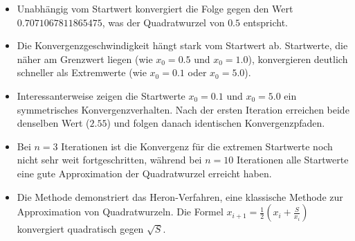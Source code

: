 \documentclass{article}
\begin{document}
\begin{itemize}
  \item Unabhängig vom Startwert konvergiert die Folge gegen den Wert $0.7071067811865475$, was der Quadratwurzel von $0.5$ entspricht.
  
  \item Die Konvergenzgeschwindigkeit hängt stark vom Startwert ab. Startwerte, die näher am Grenzwert liegen (wie $x_0 = 0.5$ und $x_0 = 1.0$), konvergieren deutlich schneller als Extremwerte (wie $x_0 = 0.1$ oder $x_0 = 5.0$).
  
  \item Interessanterweise zeigen die Startwerte $x_0 = 0.1$ und $x_0 = 5.0$ ein symmetrisches Konvergenzverhalten. Nach der ersten Iteration erreichen beide denselben Wert ($2.55$) und folgen danach identischen Konvergenzpfaden.
  
  \item Bei $n = 3$ Iterationen ist die Konvergenz für die extremen Startwerte noch nicht sehr weit fortgeschritten, während bei $n = 10$ Iterationen alle Startwerte eine gute Approximation der Quadratwurzel erreicht haben.
  
  \item Die Methode demonstriert das Heron-Verfahren, eine klassische Methode zur Approximation von Quadratwurzeln. Die Formel $x_{i+1} = \frac{1}{2}(x_i + \frac{S}{x_i})$ konvergiert quadratisch gegen $\sqrt{S}$.
\end{itemize}
\end{document}
